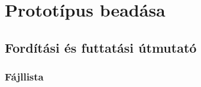 \documentclass[../../projlab]{subfiles}
\begin{document}
\makeatletter


\makeatother


\chapter{Prototípus beadása}

\section{Fordítási és futtatási útmutató}

\subsection{Fájllista}
\end{document}
